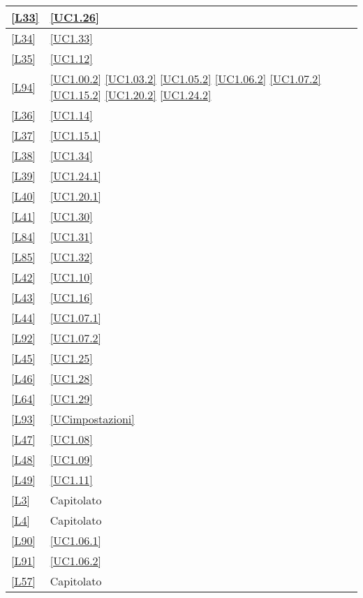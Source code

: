 \begin{longtable}{|P{6cm}|P{6cm}|}
	\hline \ref{L33} & \ref{UC1.26} \\
	\hline \ref{L34} & \ref{UC1.33} \\
	\hline \ref{L35} & \ref{UC1.12} \\
	\hline \ref{L94} & \ref{UC1.00.2} \linebreak \ref{UC1.03.2} \linebreak \ref{UC1.05.2} \linebreak \ref{UC1.06.2} \linebreak \ref{UC1.07.2} \linebreak \ref{UC1.15.2} \linebreak \ref{UC1.20.2} \linebreak \ref{UC1.24.2} \\
	\hline \ref{L36} & \ref{UC1.14} \\
	\hline \ref{L37} & \ref{UC1.15.1} \\
	\hline \ref{L38} & \ref{UC1.34} \\
	\hline \ref{L39} & \ref{UC1.24.1} \\
	\hline \ref{L40} & \ref{UC1.20.1} \\	
	\hline \ref{L41} & \ref{UC1.30} \\
 	\hline \ref{L84} & \ref{UC1.31} \\
 	\hline \ref{L85} & \ref{UC1.32} \\
	\hline \ref{L42} & \ref{UC1.10} \\
	\hline \ref{L43} & \ref{UC1.16} \\
	\hline \ref{L44} & \ref{UC1.07.1} \\
	\hline \ref{L92} & \ref{UC1.07.2} \\
	\hline \ref{L45} & \ref{UC1.25} \\
	\hline \ref{L46} & \ref{UC1.28} \\
	\hline \ref{L64} & \ref{UC1.29}  \\
	\hline \ref{L93} & \ref{UCimpostazioni} \\	 
	\hline \ref{L47} & \ref{UC1.08} \\
	\hline \ref{L48} & \ref{UC1.09} \\
	\hline \ref{L49} & \ref{UC1.11} \\
	\hline \ref{L3} & Capitolato \\
	\hline \ref{L4} & Capitolato \\
	\hline \ref{L90} & \ref{UC1.06.1} \\
	\hline \ref{L91} & \ref{UC1.06.2} \\	
	\hline \ref{L57} & Capitolato \\

\end{longtable}
